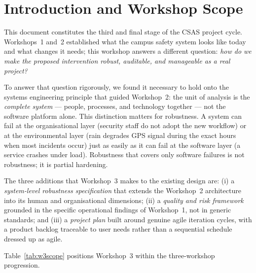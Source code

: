 \documentclass[12pt,a4paper]{article}
\begin{document}
\tableofcontents\newpage

\section{Introduction and Workshop Scope}

This document constitutes the third and final stage of the CSAS
project cycle. Workshops~1 and~2 established what the campus safety
system looks like today and what changes it needs; this workshop
answers a different question: \emph{how do we make the proposed
intervention robust, auditable, and manageable as a real project?}

To answer that question rigorously, we found it necessary to hold
onto the systems engineering principle that guided Workshop~2: the
unit of analysis is the \emph{complete system} --- people, processes,
and technology together --- not the software platform alone. This
distinction matters for robustness. A system can fail at the
organisational layer (security staff do not adopt the new workflow)
or at the environmental layer (rain degrades GPS signal during the
exact hours when most incidents occur) just as easily as it can fail
at the software layer (a service crashes under load). Robustness that
covers only software failures is not robustness; it is partial
hardening.

The three additions that Workshop~3 makes to the existing design are:
(i) a \emph{system-level robustness specification} that extends the
Workshop~2 architecture into its human and organisational dimensions;
(ii) a \emph{quality and risk framework} grounded in the specific
operational findings of Workshop~1, not in generic standards;
and (iii) a \emph{project plan} built around genuine agile
iteration cycles, with a product backlog traceable to user needs
rather than a sequential schedule dressed up as agile.

Table~\ref{tab:w3scope} positions Workshop~3 within the three-workshop
progression.
\end{document}
